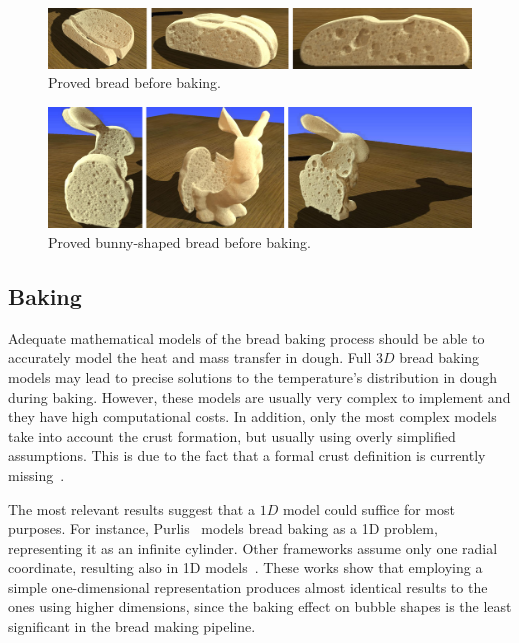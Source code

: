 \documentclass[spanish,a4paper,11pt,oneside,links]{report}
\begin{document}
\begin{figure}
\includegraphics[width=15cm]{figures/prebakebread}
\caption{Proved bread before baking.}
\label{fg:proving}
\end{figure}

\begin{figure}
\includegraphics[width=15cm]{figures/prebakebunny}
\caption{Proved bunny-shaped bread before baking.}
\label{fg:provingBunny}
\end{figure}

\subsection{Baking}
Adequate mathematical models of the bread baking process should be able to accurately model the heat and mass transfer in dough.
Full $3D$ bread baking models may lead to precise solutions to the temperature's distribution in dough during baking.
However, these models are usually very complex to implement and they have high computational costs.
In addition, only the most complex models take into account the crust formation, but usually using overly simplified assumptions.
This is due to the fact that a formal crust definition is currently missing~\cite{Vanin2009}.

The most relevant results suggest that a $1D$ model could suffice for most purposes. 
For instance, Purlis~\cite{Purlis2011} models bread baking as a 1D problem, representing it as an infinite cylinder.
Other frameworks assume only one radial coordinate, resulting also in 1D models~\cite{Powathil2004, Thorvaldsson1999}.  
These works show that employing a simple one-dimensional representation produces almost identical results to the ones using higher dimensions, since the baking effect on bubble shapes is the least significant in the bread making pipeline. 
\end{document}
